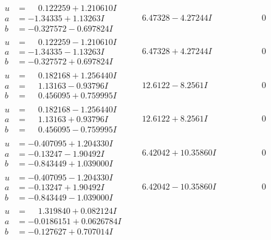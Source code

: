 \documentclass[1p]{elsarticle_modified}
\theoremstyle{definition}
\begin{document}
$$\begin{array}{c|c|c}
\begin{aligned}
u &= \phantom{-}0.122259 + 1.210610 I \\
a &= -1.34335 + 1.13263 I \\
b &= -0.327572 - 0.697824 I\end{aligned}
 & \phantom{-}6.47328 - 4.27244 I & \phantom{-0.000000 } 0 \\ \hline\begin{aligned}
u &= \phantom{-}0.122259 - 1.210610 I \\
a &= -1.34335 - 1.13263 I \\
b &= -0.327572 + 0.697824 I\end{aligned}
 & \phantom{-}6.47328 + 4.27244 I & \phantom{-0.000000 } 0 \\ \hline\begin{aligned}
u &= \phantom{-}0.182168 + 1.256440 I \\
a &= \phantom{-}1.13163 - 0.93796 I \\
b &= \phantom{-}0.456095 + 0.759995 I\end{aligned}
 & \phantom{-}12.6122 - 8.2561 I & \phantom{-0.000000 } 0 \\ \hline\begin{aligned}
u &= \phantom{-}0.182168 - 1.256440 I \\
a &= \phantom{-}1.13163 + 0.93796 I \\
b &= \phantom{-}0.456095 - 0.759995 I\end{aligned}
 & \phantom{-}12.6122 + 8.2561 I & \phantom{-0.000000 } 0 \\ \hline\begin{aligned}
u &= -0.407095 + 1.204330 I \\
a &= -0.13247 - 1.90492 I \\
b &= -0.843449 + 1.039000 I\end{aligned}
 & \phantom{-}6.42042 + 10.35860 I & \phantom{-0.000000 } 0 \\ \hline\begin{aligned}
u &= -0.407095 - 1.204330 I \\
a &= -0.13247 + 1.90492 I \\
b &= -0.843449 - 1.039000 I\end{aligned}
 & \phantom{-}6.42042 - 10.35860 I & \phantom{-0.000000 } 0 \\ \hline\begin{aligned}
u &= \phantom{-}1.319840 + 0.082124 I \\
a &= -0.0186151 + 0.0626784 I \\
b &= -0.127627 + 0.707014 I\end{aligned}

\end{array}$$
\end{document}
